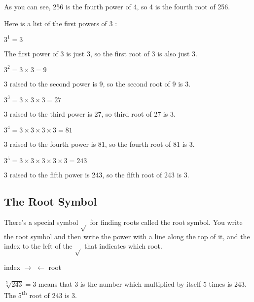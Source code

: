 \documentclass{article}
\begin{document}
\begin{spacing}{1.25}
As you can see, 256 is the fourth power of 4, so 4 is the fourth root of 256.

\pagebreak

Here is a list of the first powers of 3 :

\begin{center}
$3^1 = 3$
\end{center}
The first power of 3 is just 3, so the first root of 3 is also just 3.

\begin{center}
$3^2 = 3 \times 3 = 9$
\end{center}
3 raised to the second power is 9, so the second root of 9 is 3.

\begin{center}
$3^3 = 3 \times 3 \times 3 = 27$
\end{center}
3 raised to the third power is 27, so third root of 27 is 3.

\begin{center}
$3^4 = 3 \times 3 \times 3 \times 3 = 81$
\end{center}
3 raised to the fourth power is 81, so the fourth root of 81 is 3.

\begin{center}
$3^5 = 3 \times 3 \times 3 \times 3 \times 3 = 243$
\end{center}
3 raised to the fifth power is 243, so the fifth root of 243 is 3.

\pagebreak

\subsection*{The Root Symbol}

There’s a special symbol $\sqrt{}$ for finding roots called the root symbol.
You write the root symbol and then write the power with a line along the top of it, and the index to the left of the $\sqrt{}$ that indicates which root.\\

\begin{center}
index $\longrightarrow$ {\fontsize{40}{44}}
$\longleftarrow$ root
\end{center}



\vspace{28pt}
$\sqrt[5]{243} = 3$ means that 3 is the number which multiplied by itself 5 times is 243. The 5\textsuperscript{th} root of 243 is 3.


\end{spacing}
\end{document}
